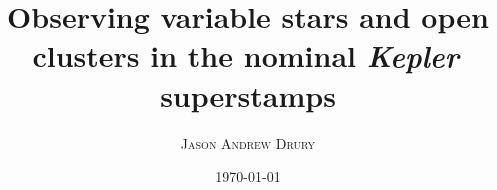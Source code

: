 \documentclass[a4paper,twoside,12pt,varwidth]{book}
\makeatletter
\def\cleardoublepage{\clearpage\if@twoside \ifodd\c@page\else
	\hbox{}
	\vspace*{\fill}
	\thispagestyle{empty}
	\newpage
	\if@twocolumn\hbox{}\newpage\fi\fi\fi}
\newcommand{\Kepler}{{\em Kepler\,}}
\makeatother
\begin{document}
\author{\textsc{Jason Andrew Drury}}
\title{Observing variable stars and open clusters in the nominal \Kepler{} superstamps}
\date{\textsc{\today}}
\maketitle






\renewcommand{\contentsname}{\textsc{Table of Contents}}
\tableofcontents
\renewcommand{\listfigurename}{\textsc{List of Figures}}
\listoffigures
\renewcommand{\listtablename}{\textsc{List of Tables}}
\listoftables



% 



\clearpage
\appendix
\clearpage
{}

%
%
%
%
%
%
%
% 
% 


\end{document}
